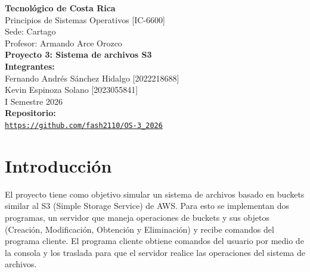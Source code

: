 \documentclass[12pt, letterpaper]{article}
\begin{document}
\begin{titlepage}
    \centering
    \vspace*{2cm}

    {\Large \textbf{Tecnológico de Costa Rica}}\\[0.5cm]
    {\large Principios de Sistemas Operativos [IC-6600]}\\[0.3cm]
    {\large Sede: Cartago}\\[0.3cm]
    {\large Profesor: Armando Arce Orozco}\\[2cm]

    {\LARGE \textbf{Proyecto 3: Sistema de archivos S3}}\\[2cm]

    {\large \textbf{Integrantes:}}\\[0.3cm]
    {\large Fernando Andrés Sánchez Hidalgo \hspace{0.5cm} [2022218688]}\\[0.2cm]
    {\large Kevin Espinoza Solano \hspace{0.5cm} [2023055841]}\\[2cm]

    {\large I Semestre 2026}\\[0.5cm]

    {\large \textbf{Repositorio:}}\\[0.2cm]
    \href{https://github.com/fash2110/OS-3_2026}{\texttt{https://github.com/fash2110/OS-3\_2026}}

    \vfill
\end{titlepage}

\tableofcontents
\newpage

\section{Introducción}
El proyecto tiene como objetivo simular un sistema de archivos basado en buckets similar al S3 (Simple Storage Service) de AWS. Para esto se implementan dos programas, un servidor que maneja operaciones de buckets y sus objetos (Creación, Modificación, Obtención y Eliminación) y recibe comandos del programa cliente. El programa cliente obtiene comandos del usuario por medio de la consola y los traslada para que el servidor realice las operaciones del sistema de archivos.
\end{document}
